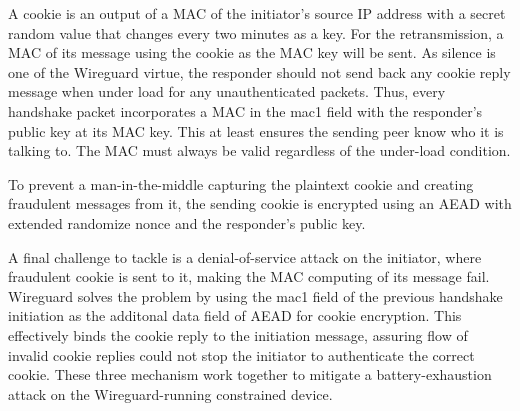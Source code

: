   A cookie is an output of a MAC of the initiator's source IP address with a secret random value that
  changes every two minutes as a key. For the retransmission, a MAC of its message using the cookie 
  as the MAC key will be sent. As silence is one of the Wireguard virtue, the responder should not 
  send back any cookie reply message when under load for any unauthenticated packets. Thus, every 
  handshake packet incorporates a MAC in the mac1 field with the responder's public key at its MAC key. 
  This at least ensures the sending peer know who it is talking to. The MAC must always be valid 
  regardless of the under-load condition. 
  
  To prevent a man-in-the-middle capturing the plaintext cookie and creating fraudulent messages from it,
  the sending cookie is encrypted using an AEAD with extended randomize nonce \cite{irtf-cfrg-xchacha-03} 
  and the responder's public key.

  A final challenge to tackle is a denial-of-service attack on the initiator, where fraudulent cookie
  is sent to it, making the MAC computing of its message fail. Wireguard solves the problem by using
  the mac1 field of the previous handshake initiation as the additonal data field of AEAD for cookie encryption. This
  effectively binds the cookie reply to the initiation message, assuring flow of invalid cookie replies
  could not stop the initiator to authenticate the correct cookie. These three mechanism work together
  to mitigate a battery-exhaustion attack on the Wireguard-running constrained device.
